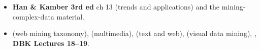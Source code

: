 \begin{itemize}
  \item \textbf{Han \& Kamber 3rd ed} ch 13 (trends and applications) and the mining-complex-data
        material. 
  \item {} (web mining taxonomy),  (multimedia),
         (text and web),  (visual data mining),
        , \textbf{DBK Lectures 18--19}.
\end{itemize}
